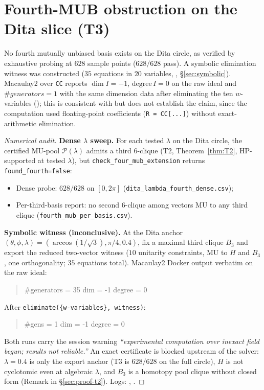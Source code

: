 \section{Fourth-MUB obstruction on the Dita slice (T3)}
\label{sec:proof-t3}

\begin{claim}
\label{claim:T3}
No fourth mutually unbiased basis exists on the Dita circle, as verified
by exhaustive probing at $628$ sample points ($628/628$ pass).
A symbolic elimination witness was constructed ($35$ equations in $20$ variables,
, \S\ref{sec:symbolic}).
Macaulay2 over \texttt{CC} reports $\dim I=-1$, $\mathrm{degree}\,I=0$ on the raw ideal
and $\#generators=1$ with the same dimension data after eliminating the ten $w$-variables
(); this is consistent with but does not establish
the claim, since the computation used floating-point coefficients (\texttt{R = CC[...]})
without exact-arithmetic elimination.
\end{claim}

\begin{proof}[Numerical audit]
\textbf{Dense $\lambda$ sweep.} For each tested $\lambda$ on the Dita circle, the certified MU-pool
$\mathcal{P}(\lambda)$ admits a third $6$-clique (T2, Theorem~\ref{thm:T2}, HP-supported at tested $\lambda$), but
\texttt{check\_four\_mub\_extension} returns \texttt{found\_fourth=false}:
\begin{itemize}
    \item Dense probe: $628/628$ on $[0,2\pi]$ (\texttt{dita\_lambda\_fourth\_dense.csv});
    \item Per-third-basis report: no second $6$-clique among vectors MU to any third clique
          (\texttt{fourth\_mub\_per\_basis.csv}).
\end{itemize}

\textbf{Symbolic witness (inconclusive).} At the Dita anchor $(\theta,\phi,\lambda)=(\arccos(1/\sqrt3),\pi/4,0.4)$,
fix a maximal third clique $B_3$ and export the reduced two-vector witness
($10$ unitarity constraints, MU to $H$ and $B_3$, one orthogonality; $35$ equations total).
Macaulay2 Docker output verbatim on the raw ideal:
\begin{quote}
\ttfamily\#generators = 35 dim = -1 degree = 0
\end{quote}
After \texttt{eliminate(\{w-variables\}, witness)}:
\begin{quote}
\ttfamily\#gens = 1 dim = -1 degree = 0
\end{quote}
Both runs carry the session warning \emph{``experimental computation over inexact field begun; results not reliable.''}
An exact certificate is blocked upstream of the solver: $\lambda{=}0.4$ is only the export anchor (T3 is $628/628$ on the full circle), $H$ is not cyclotomic even at algebraic $\lambda$, and $B_3$ is a homotopy pool clique without closed form (Remark in \S\ref{sec:proof-t2}).
Logs: ,
.
\end{proof}


